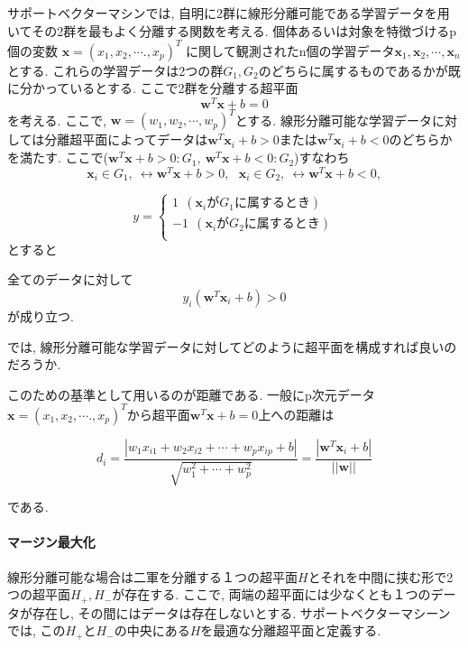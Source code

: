 \documentclass{jarticle}
\begin{document}
サポートベクターマシンでは,
自明に2群に線形分離可能である学習データを用いてその2群を最もよく分離する関数を考える.
個体あるいは対象を特徴づけるp個の変数
\(\bm{x} = (x_1, x_2, \cdots., x_p)^T\) に関して観測されたn個の学習データ$\bm{x}_1,\bm{x}_2,\cdots,\bm{x}_n$とする.
これらの学習データは2つの群$G_1, G_2$のどちらに属するものであるかが既に分かっているとする. 
ここで2群を分離する超平面
\[\bm{w}^T\bm{x} + b = 0\]
を考える. ここで, $\bm{w} = (w_1, w_2, \cdots, w_p)^T$とする.
線形分離可能な学習データに対しては分離超平面によってデータは$\bm{w}^T\bm{x}_i + b  > 0$または$\bm{w}^T\bm{x}_i + b < 0$のどちらかを満たす.
ここで($ \bm{w}^T\bm{x} + b > 0 : G_1,\ \bm{w}^T\bm{x} + b < 0 : G_2$)すなわち
\[\bm{x}_i \in G_1,\ \leftrightarrow  \bm{w}^T\bm{x} + b > 0,\ \ \ \bm{x}_i \in G_2,\ \leftrightarrow  \bm{w}^T\bm{x} + b < 0,\]


\begin{equation}
y = 
     \left\{
     \begin{aligned}
        1\ \ (\bm{x}_i\mbox{が} G_1 \mbox{に属するとき}) \\
        -1\ \ (\bm{x}_i\mbox{が} G_2 \mbox{に属するとき})\\
     \end{aligned}
     \right.
 \end{equation}
とすると 

全てのデータに対して
\[y_i(\bm{w}^T\bm{x}_i + b) > 0\]
が成り立つ.
 
 では, 線形分離可能な学習データに対してどのように超平面を構成すれば良いのだろうか.
 
このための基準として用いるのが距離である. 一般にp次元データ\(\bm{x} = (x_1, x_2, \cdots., x_p)^T\)から超平面$ \bm{w}^T\bm{x} + b = 0$上への距離は

 
 \[ d_i = \frac{|w_1x_{i1} + w_2x_{i2} + \cdots + w_px_{ip} + b|}{\sqrt{w_1^2 +\cdots+ w_p^2}} = \frac{|\bm{w}^T\bm{x}_i + b|}{||\bm{w}||}\]
 
 である.
 
 
\paragraph{マージン最大化}
 
 線形分離可能な場合は二軍を分離する１つの超平面$H$とそれを中間に挟む形で2つの超平面$ H_+, H_-$が存在する.
ここで, 両端の超平面には少なくとも１つのデータが存在し, その間にはデータは存在しないとする. サポートベクターマシーンでは, この$ H_+$と$ H_-$の中央にある$H$を最適な分離超平面と定義する.
 
\end{document}
